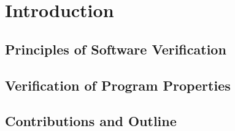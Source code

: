 \chapter{Introduction}

\section{Principles of Software Verification}

\section{Verification of Program Properties}

\section{Contributions and Outline}
